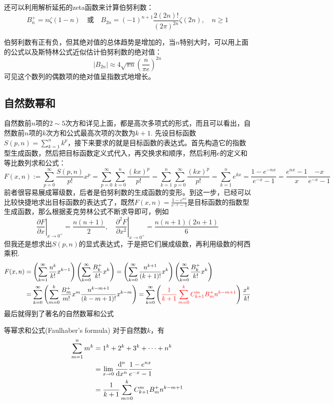 \documentclass[main.tex]{subfiles}
\begin{document}
还可以利用解析延拓的zeta函数来计算伯努利数：
\[ B_n^+ = n\zeta(1-n) \quad \mbox{或} \quad B_{2n} = (-1)^{n+1}\frac{2(2n)!}{(2\pi)^{2n}}\zeta(2n), \quad n \geq 1\]



\par 伯努利数有正有负，但其绝对值的总体趋势是增加的，当\(n\)特别大时，可以用上面的公式以及斯特林公式近似估计伯努利数的绝对值：
\[ | B_{2n} | \approx 4\sqrt{\pi n}\left(\frac{n}{\pi e} \right)^{2n} \]
可见这个数列的偶数项的绝对值呈指数式地增长。

\subsection{自然数幂和}

自然数前\(n\)项的\(2\sim5\)次方和详见上面，都是高次多项式的形式，而且可以看出，自然数前\(n\)项的\(k\)次方和公式最高次项的次数为\(k+1\).
先设目标函数\(S(p,n) = \sum_{k=1}^n k^p\)，接下来要求的就是目标函数的表达式。首先构造它的指数型生成函数，然后把目标函数定义式代入，再交换求和顺序，然后利用\(e\)的定义和等比数列求和公式：
\[ F(x,n) := \sum_{p=0}^{\infty} \frac{S(p,n)}{p!}x^p = \sum_{p=0}^{\infty}\sum_{k=0}^{n}\frac{(kx)^p}{p!} = \sum_{k=1}^{n} \sum_{p=0}^{\infty} \frac{(kx)^p}{p!}  = \sum_{k=1}^{n} e^{kx} = \frac{1-e^{-nx}}{e^{-x}-1} = \frac{e^{nx}-1}{x}\frac{-x}{e^{-x}-1}\]
前者很容易展成幂级数，后者是伯努利数的生成函数的变形。到这一步，已经可以比较快捷地求出目标函数的表达式了，既然\(\displaystyle{F(x,n)=\frac{1-e^{nx}}{e^{-x}-1}}\)是目标函数的指数型生成函数，那么根据麦克劳林公式不断求导即可，例如
\[\displaystyle{\left.\frac{\partial F}{\partial x}\right|_{x \to 0^+} = \frac{n(n+1)}{2}, \quad \left.\frac{\partial^2 F}{\partial x^2}\right|_{x \to 0^+} = \frac{n(n+1)(2n+1)}{6}} \]
但我还是想求出\(S(p,n)\)的显式表达式，于是把它们展成级数，再利用级数的柯西乘积.
\begin{align*}
    F(x,n) &= \left(\sum_{k=1}^{\infty} \frac{n^k}{k!}x^{k-1}\right)\left(\sum_{k=0}^{\infty} \frac{B_k^+}{k!}x^k\right) = \left(\sum_{k=0}^{\infty} \frac{n^{k+1}}{(k+1)!}x^{k}\right)\left(\sum_{k=0}^{\infty} \frac{B_k^+}{k!}x^k\right) \\
    & = \sum_{k=0}^{\infty}\left(\sum_{m=0}^{k} \frac{B_m^+}{m!}x^m\frac{n^{k-m+1}}{(k-m+1)!}x^{k-m}\right) = \sum_{k=0}^{\infty}\left({\color{red} \frac{1}{k+1}\sum_{m=0}^{k}C_{k+1}^m B_m^+ n^{k-m+1}}\right)\frac{x^k}{k!}
\end{align*}
最后就得到了著名的自然数幂和公式
\begin{theorem}{等幂求和公式(Faulhaber's formula)}
    对于自然数\(k\)，有
    \begin{align*}
        \sum_{m=1}^n m^k &= 1^k+2^k+3^k+\cdots+n^k \\
        &= \lim_{x \to 0}\frac{{\rm d}^n}{{\rm d}x^n}\frac{1-e^{nx}}{e^{-x}-1} \\
        &= \frac{1}{k+1}\sum_{m=0}^{k} C_{k+1}^m B_m^+ n^{k-m+1}
    \end{align*}
\end{theorem}
\end{document}
